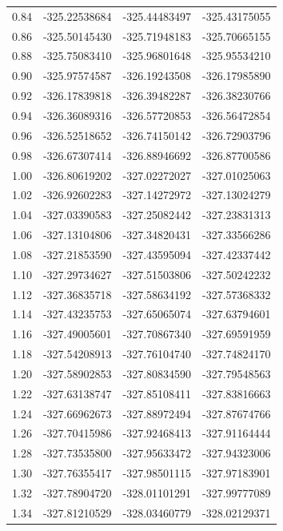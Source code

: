 {{\begin{longtable}{p{} p{} p{} p{}}
    0.84  & -325.22538684 & -325.44483497 & -325.43175055 \\
    0.86  & -325.50145430 & -325.71948183 & -325.70665155 \\
    0.88  & -325.75083410 & -325.96801648 & -325.95534210 \\
    0.90  & -325.97574587 & -326.19243508 & -326.17985890 \\
    0.92  & -326.17839818 & -326.39482287 & -326.38230766 \\
    0.94  & -326.36089316 & -326.57720853 & -326.56472854 \\
    0.96  & -326.52518652 & -326.74150142 & -326.72903796 \\
    0.98  & -326.67307414 & -326.88946692 & -326.87700586 \\
    1.00  & -326.80619202 & -327.02272027 & -327.01025063 \\
    1.02  & -326.92602283 & -327.14272972 & -327.13024279 \\
    1.04  & -327.03390583 & -327.25082442 & -327.23831313 \\
    1.06  & -327.13104806 & -327.34820431 & -327.33566286 \\
    1.08  & -327.21853590 & -327.43595094 & -327.42337442 \\
    1.10  & -327.29734627 & -327.51503806 & -327.50242232 \\
    1.12  & -327.36835718 & -327.58634192 & -327.57368332 \\
    1.14  & -327.43235753 & -327.65065074 & -327.63794601 \\
    1.16  & -327.49005601 & -327.70867340 & -327.69591959 \\
    1.18  & -327.54208913 & -327.76104740 & -327.74824170 \\
    1.20  & -327.58902853 & -327.80834590 & -327.79548563 \\
    1.22  & -327.63138747 & -327.85108411 & -327.83816663 \\
    1.24  & -327.66962673 & -327.88972494 & -327.87674766 \\
    1.26  & -327.70415986 & -327.92468413 & -327.91164444 \\
    1.28  & -327.73535800 & -327.95633472 & -327.94323006 \\
    1.30  & -327.76355417 & -327.98501115 & -327.97183901 \\
    1.32  & -327.78904720 & -328.01101291 & -327.99777089 \\
    1.34  & -327.81210529 & -328.03460779 & -328.02129371 \\

\end{longtable}}}
